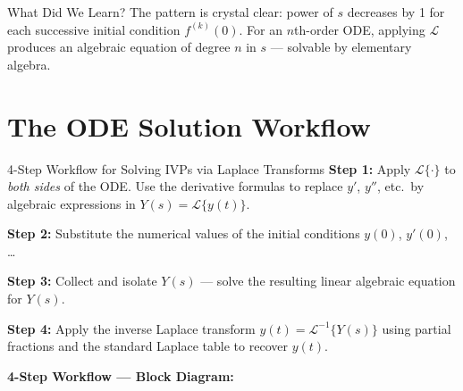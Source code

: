 \documentclass[12pt,a4paper]{article}
\begin{document}
\begin{learnbox}{What Did We Learn?}
The pattern is crystal clear: power of $s$ decreases by 1 for each
successive initial condition $f^{(k)}(0)$. For an $n$th-order ODE,
applying $\mathcal{L}$ produces an algebraic equation of degree $n$
in $s$ --- solvable by elementary algebra.
\end{learnbox}

\section{The ODE Solution Workflow}

\begin{infobox}{4-Step Workflow for Solving IVPs via Laplace Transforms}
\textbf{Step 1:} Apply $\mathcal{L}\{\cdot\}$ to \emph{both sides} of
the ODE. Use the derivative formulas to replace $y'$, $y''$, etc.\ by
algebraic expressions in $Y(s) = \mathcal{L}\{y(t)\}$.

\textbf{Step 2:} Substitute the numerical values of the initial
conditions $y(0)$, $y'(0)$, \ldots

\textbf{Step 3:} Collect and isolate $Y(s)$ --- solve the resulting
linear algebraic equation for $Y(s)$.

\textbf{Step 4:} Apply the inverse Laplace transform
$y(t) = \mathcal{L}^{-1}\{Y(s)\}$ using partial fractions and the
standard Laplace table to recover $y(t)$.
\end{infobox}

\medskip
\textbf{4-Step Workflow --- Block Diagram:}

\begin{center}
\end{center}
\end{document}
